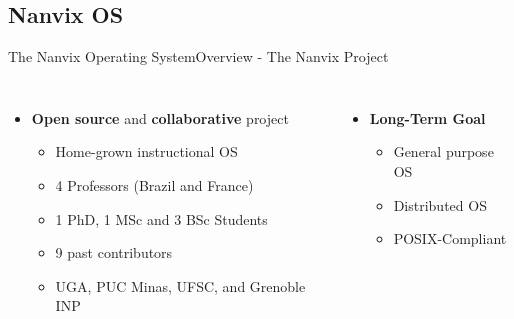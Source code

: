 

	\subsection{Nanvix OS}

		\begin{frame}[fragile]{The Nanvix Operating System}{Overview - The Nanvix Project}

		\begin{columns}[totalwidth=\linewidth]


			\begin{columns}[totalwidth=\linewidth]

					\begin{itemize}
						\item \textbf{Open source} and \textbf{collaborative} project
						\begin{itemize}
							\item Home-grown instructional OS
							\item 4 Professors (Brazil and France)
							\item 1 PhD, 1 MSc and 3 BSc Students
							\item 9 past contributors
							\item UGA, PUC Minas, UFSC, and Grenoble INP
						\end{itemize}
					\end{itemize}

			\end{columns} 

			\vspace{.5cm}

			\begin{columns}[totalwidth=\linewidth]

					\begin{itemize}
						\item \textbf{Long-Term Goal}
						\begin{itemize}
							\item General purpose OS
							\item Distributed OS
							\item POSIX-Compliant
						\end{itemize}
					\end{itemize}


\end{columns}
\end{columns}
\end{frame}
